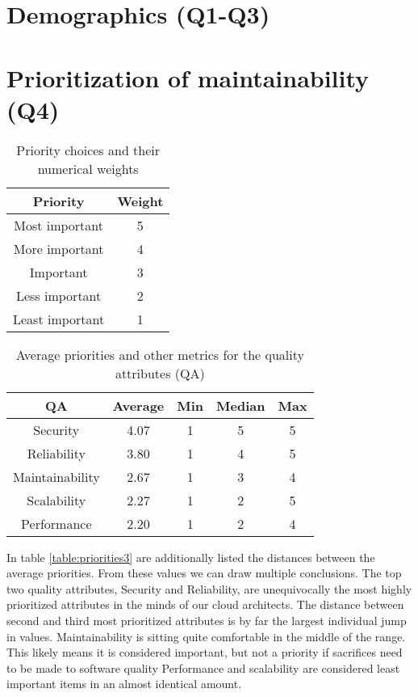\documentclass[utf8,english]{gradu3}
\begin{document}
\section{Demographics (Q1-Q3)}

\section{Prioritization of maintainability (Q4)}

\begin{table}[!h]
  \begin{center}
    \caption{Priority choices and their numerical weights}
    \label{table:priorities1}
    \begin{tabular}{|c|c|}
      \hline
      \textbf{Priority} & \textbf{Weight} \\
      \hline
      Most important & 5 \\
      More important & 4 \\
      Important & 3 \\
      Less important & 2 \\
      Least important & 1 \\
      \hline
    \end{tabular}
  \end{center}
\end{table}


\begin{table}[!h]
  \begin{center}
    \caption{Average priorities and other metrics for the quality attributes (QA)}
    \label{table:priorities2}
    \begin{tabular}{|c|c|c|c|c|}
      \hline
      \textbf{QA} & \textbf{Average} & \textbf{Min} & \textbf{Median} & \textbf{Max} \\
      \hline
      Security & 4.07 & 1 & 5 & 5 \\
      Reliability & 3.80 & 1 & 4 & 5 \\
      Maintainability & 2.67 & 1 & 3 & 4 \\
      Scalability & 2.27 & 1 & 2 & 5 \\
      Performance & 2.20 & 1 & 2 & 4 \\
      \hline
    \end{tabular}
  \end{center}
\end{table}


In table \ref{table:priorities3} are additionally listed the distances between the average priorities.
From these values we can draw multiple conclusions.
The top two quality attributes, Security and Reliability, are unequivocally the most highly prioritized attributes in the minds of our cloud architects.
The distance between second and third most prioritized attributes is by far the largest individual jump in values.
Maintainability is sitting quite comfortable in the middle of the range.
This likely means it is considered important, but not a priority if sacrifices need to be made to software quality
Performance and scalability are considered least important items in an almost identical amount.
\end{document}
